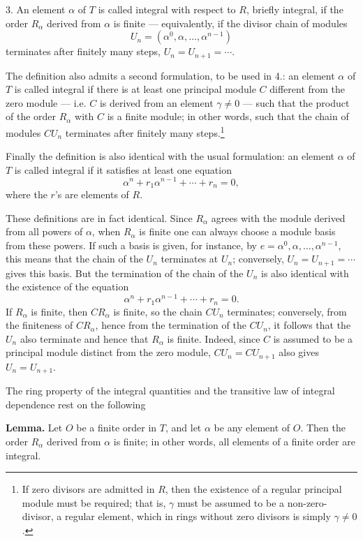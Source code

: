 \documentclass[11pt]{article}
\begin{document}
3. An element $\alpha$ of $T$ is called integral with respect to $R$, briefly integral,
if the order $R_\alpha$ derived from $\alpha$ is finite — equivalently, if the divisor
chain of modules
\[
        U_n=(\alpha^0,\alpha,\ldots,\alpha^{n-1})
\]
terminates after finitely many steps, $U_n=U_{n+1}=\cdots$.

The definition also admits a second formulation, to be used in 4.: an element
$\alpha$ of $T$ is called integral if there is at least one principal module $C$
different from the zero module — i.e. $C$ is derived from an element $\gamma\ne0$
— such that the product of the order $R_\alpha$ with $C$ is a finite module; in
other words, such that the chain of modules $CU_n$ terminates after finitely many
steps.\footnote{If zero divisors are admitted in $R$, then the existence of a regular
principal module must be required; that is, $\gamma$ must be assumed to be a
non-zero-divisor, a regular element, which in rings without zero divisors is simply
$\gamma\ne0$.}

Finally the definition is also identical with the usual formulation: an element
$\alpha$ of $T$ is called integral if it satisfies at least one equation
\[
        \alpha^n+r_1\alpha^{n-1}+\cdots+r_n=0,
\]
where the $r$'s are elements of $R$.

These definitions are in fact identical. Since $R_\alpha$ agrees with the module
derived from all powers of $\alpha$, when $R_\alpha$ is finite one can always choose
a module basis from these powers. If such a basis is given, for instance, by
$e=\alpha^0,\alpha,\ldots,\alpha^{n-1}$, this means that the chain of the $U_n$
terminates at $U_n$; conversely, $U_n=U_{n+1}=\cdots$ gives this basis. But the
termination of the chain of the $U_n$ is also identical with the existence of the
equation
\[
        \alpha^n+r_1\alpha^{n-1}+\cdots+r_n=0.
\]
If $R_\alpha$ is finite, then $CR_\alpha$ is finite, so the chain $CU_n$ terminates;
conversely, from the finiteness of $CR_\alpha$, hence from the termination of the
$CU_n$, it follows that the $U_n$ also terminate and hence that $R_\alpha$ is finite.
Indeed, since $C$ is assumed to be a principal module distinct from the zero module,
$CU_n=CU_{n+1}$ also gives $U_n=U_{n+1}$.

The ring property of the integral quantities and the transitive law of integral
dependence rest on the following

\medskip
\noindent\textbf{Lemma.} Let $O$ be a finite order in $T$, and let $\alpha$ be any
element of $O$. Then the order $R_\alpha$ derived from $\alpha$ is finite; in other
words, all elements of a finite order are integral.
\end{document}

